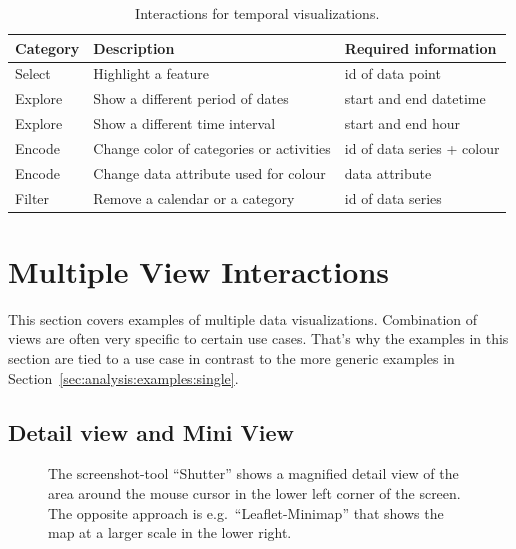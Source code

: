 
\begin{table}
  \caption{Interactions for temporal visualizations.}%
  \label{fig:analysis:temporal:interactions}
  \begin{tabular*}{\textwidth}{lll}
    \bf Category & \bf Description & \bf Required information \\
    \hline
    Select & Highlight a feature & id of data point \\
    Explore & Show a different period of dates & start and end datetime \\
    Explore & Show a different time interval & start and end hour\\
    Encode & Change color of categories or activities & id of data series + colour \\
    Encode & Change data attribute used for colour & data attribute \\
    Filter & Remove a calendar or a category & id of data series \\
  \end{tabular*}
\end{table}

\section{Multiple View Interactions}\label{sec:analysis:examples:multiple}

This section covers examples of multiple data visualizations.
Combination of views are often very specific to certain use cases.
That's why the examples in this section are tied to a use case in contrast to the more generic examples in Section~\ref{sec:analysis:examples:single}.


\subsection{Detail view and Mini View}
\begin{figure}
  \centering
  \caption{
    The screenshot-tool ``Shutter'' shows a magnified detail view of the area around the mouse cursor in the lower left corner of the screen.
  The opposite approach is e.g.\ ``Leaflet-Minimap'' that shows the map at a larger scale in the lower right.
  }
  \label{fig:analysis:detail}
  \qquad
\end{figure}


